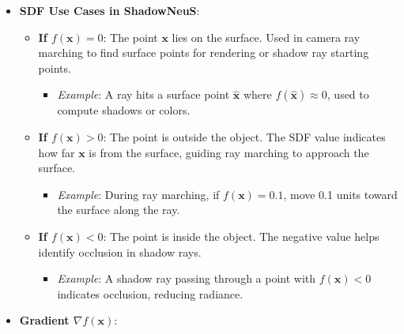 \documentclass[12pt]{article}
\theoremstyle{definition}
\begin{document}
\begin{itemize}
    \item \textbf{SDF Use Cases in ShadowNeuS}:
        \begin{itemize}
            \item \textbf{If \( f(\mathbf{x}) = 0 \)}: The point \(\mathbf{x}\) lies on the surface. Used in camera ray marching to find surface points for rendering or shadow ray starting points.
                \begin{itemize}
                    \item \textit{Example}: A ray hits a surface point \(\hat{\mathbf{x}}\) where \( f(\hat{\mathbf{x}}) \approx 0 \), used to compute shadows or colors.
                \end{itemize}
            \item \textbf{If \( f(\mathbf{x}) > 0 \)}: The point is outside the object. The SDF value indicates how far \(\mathbf{x}\) is from the surface, guiding ray marching to approach the surface.
                \begin{itemize}
                    \item \textit{Example}: During ray marching, if \( f(\mathbf{x}) = 0.1 \), move 0.1 units toward the surface along the ray.
                \end{itemize}
            \item \textbf{If \( f(\mathbf{x}) < 0 \)}: The point is inside the object. The negative value helps identify occlusion in shadow rays.
                \begin{itemize}
                    \item \textit{Example}: A shadow ray passing through a point with \( f(\mathbf{x}) < 0 \) indicates occlusion, reducing radiance.
                \end{itemize}
        \end{itemize}
    \item \textbf{Gradient \( \nabla f(\mathbf{x}) \)}:
\end{itemize}
\end{document}
